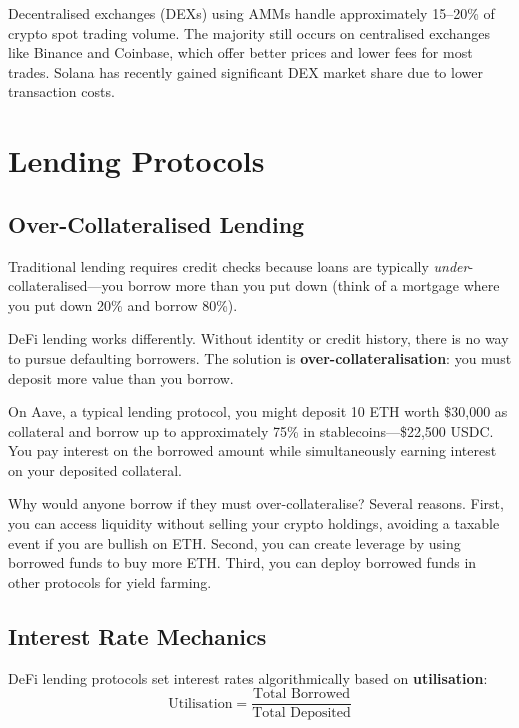 \documentclass[11pt,a4paper]{article}
\newcommand{\keyword}[1]{\textbf{\textcolor{AccentOrange}{#1}}}
\begin{document}
Decentralised exchanges (DEXs) using AMMs handle approximately 15--20\% of crypto spot trading volume. The majority still occurs on centralised exchanges like Binance and Coinbase, which offer better prices and lower fees for most trades. Solana has recently gained significant DEX market share due to lower transaction costs.

\section{Lending Protocols}

\subsection{Over-Collateralised Lending}

Traditional lending requires credit checks because loans are typically \textit{under}-collateralised---you borrow more than you put down (think of a mortgage where you put down 20\% and borrow 80\%).

DeFi lending works differently. Without identity or credit history, there is no way to pursue defaulting borrowers. The solution is \keyword{over-collateralisation}: you must deposit more value than you borrow.

On Aave, a typical lending protocol, you might deposit 10 ETH worth \$30,000 as collateral and borrow up to approximately 75\% in stablecoins---\$22,500 USDC. You pay interest on the borrowed amount while simultaneously earning interest on your deposited collateral.

Why would anyone borrow if they must over-collateralise? Several reasons. First, you can access liquidity without selling your crypto holdings, avoiding a taxable event if you are bullish on ETH. Second, you can create leverage by using borrowed funds to buy more ETH. Third, you can deploy borrowed funds in other protocols for yield farming.

\subsection{Interest Rate Mechanics}

DeFi lending protocols set interest rates algorithmically based on \keyword{utilisation}:
\[
\text{Utilisation} = \frac{\text{Total Borrowed}}{\text{Total Deposited}}
\]
\end{document}
